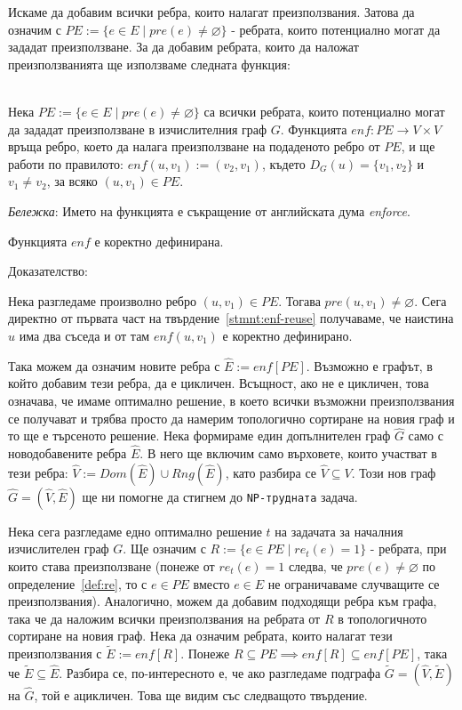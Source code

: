 \documentclass[12pt,twoside,a4paper]{article}
\begin{document}
	Искаме да добавим всички ребра, които налагат преизползвания. Затова да означим с $PE := \{e \in E \mid pre(e) \neq \varnothing\}$ - ребрата, които потенциално могат да зададат преизползване. За да добавим ребрата, които да наложат преизползванията ще използваме следната функция:
	
	\newpage
	\begin{definition}\label{def:enf}~\\
		\indent Нека $PE := \{e \in E \mid pre(e) \neq \varnothing\}$ са всички ребрата, които потенциално могат да зададат преизползване в изчислителния граф $G$. Функцията $enf \colon PE \to V \times V$ връща ребро, което да налага преизползване на подаденото ребро от $PE$, и ще работи по правилото: $enf(u,v_1):=(v_2, v_1)$, където $D_G(u)=\{v_1, v_2\}$ и $v_1 \neq v_2$, за всяко $(u,v_1) \in PE$.
		
		\textit{Бележка}: Името на функцията е съкращение от английската дума \textit{enforce}.
	\end{definition}
	
	\begin{statement}\label{stmnt:enf-corr} Функцията $enf$ е коректно дефинирана.
		
		\noindent Доказателство:
		
		Нека разгледаме произволно ребро $(u,v_1) \in PE$. Тогава $pre(u,v_1) \neq \varnothing$. Сега директно от първата част на твърдение~\ref{stmnt:enf-reuse} получаваме, че наистина $u$ има два съседа и от там $enf(u,v_1)$ е коректно дефинирано.
	\end{statement}
	
	Така можем да означим новите ребра с $\hat{E}:=enf[PE]$. Възможно е графът, в който добавим тези ребра, да е цикличен. Всъщност, ако не е цикличен, това означава, че имаме оптимално решение, в което всички възможни преизползвания се получават и трябва просто да намерим топологично сортиране на новия граф и то ще е търсеното решение. Нека формираме един допълнителен граф $\hat{G}$ само с новодобавените ребра $\hat{E}$. В него ще включим само върховете, които участват в тези ребра: $\hat{V}:=Dom(\hat{E}) \cup Rng(\hat{E})$, като разбира се $\hat{V} \subseteq V$. Този нов граф $\hat{G} = (\hat{V}, \hat{E})$ ще ни помогне да стигнем до \texttt{NP-трудната} задача.
	
	Нека сега разгледаме едно оптимално решение $t$ на задачата за началния изчислителен граф $G$. Ще означим с $R:=\{e \in PE \mid re_t(e)=1\}$ - ребрата, при които става преизползване (понеже от $re_t(e)=1$ следва, че $pre(e) \neq \varnothing$ по определение~\ref{def:re}, то с $e \in PE$ вместо $e \in E$ не ограничаваме случващите се преизползвания). Аналогично, можем да добавим подходящи ребра към графа, така че да наложим всички преизползвания на ребрата от $R$ в топологичното сортиране на новия граф. Нека да означим ребрата, които налагат тези преизползвания с $\tilde{E}:=enf[R]$. Понеже $R \subseteq PE \implies enf[R] \subseteq enf[PE]$, така че $\tilde{E} \subseteq \hat{E}$. Разбира се, по-интересното е, че ако разгледаме подграфа $\tilde{G}=(\hat{V},\tilde{E})$ на $\hat{G}$, той е ацикличен. Това ще видим със следващото твърдение.
	
\end{document}
